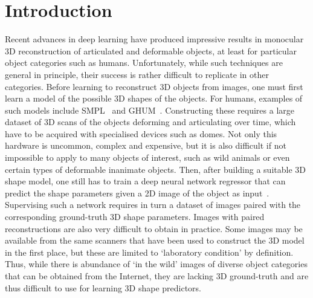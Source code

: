 \section{Introduction}

Recent advances in deep learning have produced impressive results in monocular 3D reconstruction of articulated and deformable objects, at least for particular object categories such as humans.
Unfortunately, while such techniques are general in principle, their success is rather difficult to replicate in other categories.
Before learning to reconstruct 3D objects from images, one must first learn a model of the possible 3D shapes of the objects.
For humans, examples of such models include SMPL~\cite{loper15smpl:} and GHUM~\cite{xu2020ghum}.
Constructing these requires a large dataset of 3D scans of the objects deforming and articulating over time, which have to be acquired with specialised devices such as domes.
Not only this hardware is uncommon, complex and expensive, but it is also difficult if not impossible to apply to many objects of interest, such as wild animals or even certain types of deformable inanimate objects.
Then, after building a suitable 3D shape model, one still has to train a deep neural network regressor that can predict the shape parameters given a 2D image of the object as input~\cite{kolotouros19convolutional,zanfir2020neural,Kanazawa2018}.
Supervising such a network requires in turn a dataset of images paired with the corresponding ground-truth 3D shape parameters.
Images with paired reconstructions are also very difficult to obtain in practice.
Some images may be available from the same scanners that have been used to construct the 3D model in the first place, but these are limited to `laboratory condition' by definition.
Thus, while there is abundance of `in the wild' images of diverse object categories that can be obtained from the Internet, they are lacking 3D ground-truth and are thus difficult to use for learning 3D shape predictors.

